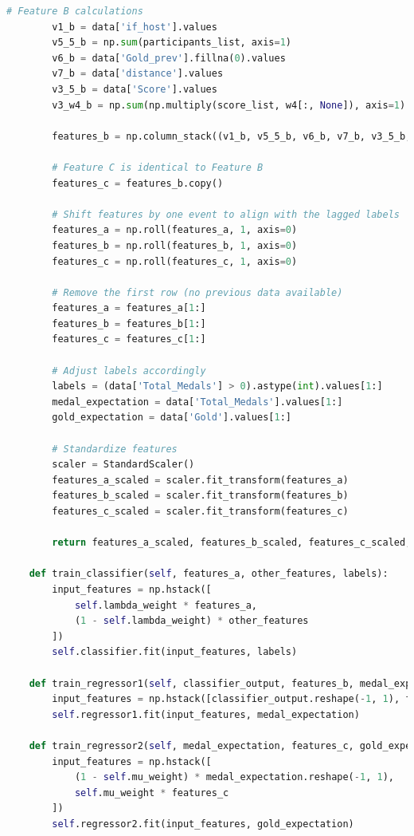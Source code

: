 \documentclass[12pt]{article}
\begin{document}
\begin{lstlisting}[language=Python, style=mystyle, caption=model.ipynb]
        # Feature B calculations
        v1_b = data['if_host'].values
        v5_5_b = np.sum(participants_list, axis=1)
        v6_b = data['Gold_prev'].fillna(0).values
        v7_b = data['distance'].values
        v3_5_b = data['Score'].values
        v3_w4_b = np.sum(np.multiply(score_list, w4[:, None]), axis=1)
        
        features_b = np.column_stack((v1_b, v5_5_b, v6_b, v7_b, v3_5_b, v3_w4_b))
        
        # Feature C is identical to Feature B
        features_c = features_b.copy()
        
        # Shift features by one event to align with the lagged labels
        features_a = np.roll(features_a, 1, axis=0)
        features_b = np.roll(features_b, 1, axis=0)
        features_c = np.roll(features_c, 1, axis=0)
        
        # Remove the first row (no previous data available)
        features_a = features_a[1:]
        features_b = features_b[1:]
        features_c = features_c[1:]
        
        # Adjust labels accordingly
        labels = (data['Total_Medals'] > 0).astype(int).values[1:]
        medal_expectation = data['Total_Medals'].values[1:]
        gold_expectation = data['Gold'].values[1:]
        
        # Standardize features
        scaler = StandardScaler()
        features_a_scaled = scaler.fit_transform(features_a)
        features_b_scaled = scaler.fit_transform(features_b)
        features_c_scaled = scaler.fit_transform(features_c)
        
        return features_a_scaled, features_b_scaled, features_c_scaled, labels, medal_expectation, gold_expectation

    def train_classifier(self, features_a, other_features, labels):
        input_features = np.hstack([
            self.lambda_weight * features_a,
            (1 - self.lambda_weight) * other_features
        ])
        self.classifier.fit(input_features, labels)

    def train_regressor1(self, classifier_output, features_b, medal_expectation):
        input_features = np.hstack([classifier_output.reshape(-1, 1), features_b])
        self.regressor1.fit(input_features, medal_expectation)

    def train_regressor2(self, medal_expectation, features_c, gold_expectation):
        input_features = np.hstack([
            (1 - self.mu_weight) * medal_expectation.reshape(-1, 1),
            self.mu_weight * features_c
        ])
        self.regressor2.fit(input_features, gold_expectation)


\end{lstlisting}
\end{document}
